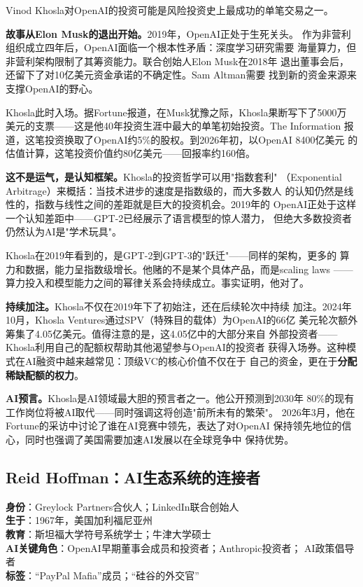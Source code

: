 Vinod Khosla对OpenAI的投资可能是风险投资史上最成功的单笔交易之一。

\textbf{故事从Elon Musk的退出开始。}2019年，OpenAI正处于生死关头。
作为非营利组织成立四年后，OpenAI面临一个根本性矛盾：深度学习研究需要
海量算力，但非营利架构限制了其筹资能力。联合创始人Elon Musk在2018年
退出董事会后，还留下了对10亿美元资金承诺的不确定性。Sam Altman需要
找到新的资金来源来支撑OpenAI的野心。

Khosla此时入场。据Fortune报道，在Musk犹豫之际，Khosla果断写下了5000万
美元的支票——这是他40年投资生涯中最大的单笔初始投资。The Information
报道，这笔投资换取了OpenAI约5\%的股权。到2026年初，以OpenAI 8400亿美元
的估值计算，这笔投资价值约80亿美元——回报率约160倍。

\textbf{这不是运气，是认知框架。}Khosla的投资哲学可以用"指数套利"
（Exponential Arbitrage）来概括：当技术进步的速度是指数级的，而大多数人
的认知仍然是线性的，指数与线性之间的差距就是巨大的投资机会。2019年的
OpenAI正处于这样一个认知差距中——GPT-2已经展示了语言模型的惊人潜力，
但绝大多数投资者仍然认为AI是"学术玩具"。

Khosla在2019年看到的，是GPT-2到GPT-3的"跃迁"——同样的架构，更多的
算力和数据，能力呈指数级增长。他赌的不是某个具体产品，而是scaling laws
——算力投入和模型能力之间的幂律关系会持续成立。事实证明，他对了。

\textbf{持续加注。}Khosla不仅在2019年下了初始注，还在后续轮次中持续
加注。2024年10月，Khosla Ventures通过SPV（特殊目的载体）为OpenAI的66亿
美元轮次额外筹集了4.05亿美元。值得注意的是，这4.05亿中的大部分来自
外部投资者——Khosla利用自己的配额权帮助其他渴望参与OpenAI的投资者
获得入场券。这种模式在AI融资中越来越常见：顶级VC的核心价值不仅在于
自己的资金，更在于\textbf{分配稀缺配额的权力}。

\textbf{AI预言。}Khosla是AI领域最大胆的预言者之一。他公开预测到2030年
80\%的现有工作岗位将被AI取代——同时强调这将创造"前所未有的繁荣"。
2026年3月，他在Fortune的采访中讨论了谁在AI竞赛中领先，表达了对OpenAI
保持领先地位的信心，同时也强调了美国需要加速AI发展以在全球竞争中
保持优势。


\subsection{Reid Hoffman：AI生态系统的连接者}
\label{subsec:inv-hoffman}

\begin{corebox}
\textbf{身份}：Greylock Partners合伙人；LinkedIn联合创始人 \\
\textbf{生于}：1967年，美国加利福尼亚州 \\
\textbf{教育}：斯坦福大学符号系统学士；牛津大学硕士 \\
\textbf{AI关键角色}：OpenAI早期董事会成员和投资者；Anthropic投资者；
  AI政策倡导者 \\
\textbf{标签}：``PayPal Mafia''成员；``硅谷的外交官''
\end{corebox}

